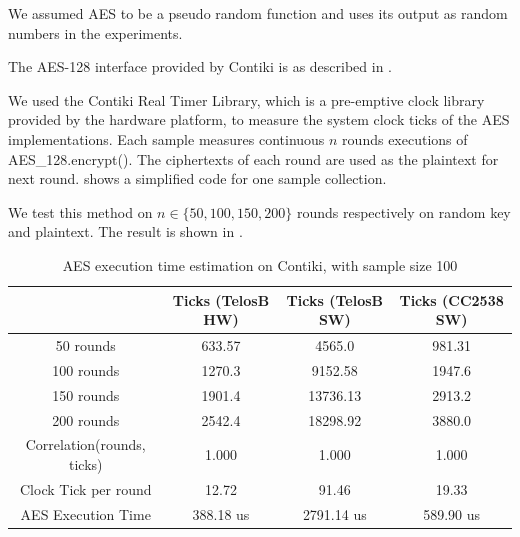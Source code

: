 We assumed AES to be a pseudo random function and uses its output as random numbers in the experiments.

The AES-128 interface provided by Contiki is as described in .

 

We used the Contiki Real Timer Library\cite{RTimer}, which is a pre-emptive clock library provided by the hardware platform, to measure the system clock ticks of the AES implementations. Each sample measures continuous $n$ rounds executions of AES\_128.encrypt(). The ciphertexts of each round are used as the plaintext for next round.
 shows a simplified code for one sample collection.

 

We test this method on  $n \in \{ 50, 100, 150, 200\}$ rounds respectively on random key and plaintext. The result is shown in .

\begin{table}[ht!]
	\center
	\begin{tabular}{|c|c|c|c|}
	\hline
	                               & Ticks (TelosB HW) & Ticks (TelosB SW) & Ticks (CC2538 SW) \\ \hline
	50 rounds                      & 633.57                  & 4565.0                  & 981.31                  \\ \hline
	100 rounds                     & 1270.3                  & 9152.58                 & 1947.6                  \\ \hline
	150 rounds                     & 1901.4                  & 13736.13                & 2913.2                  \\ \hline
	200 rounds                     & 2542.4                  & 18298.92                & 3880.0                  \\ \hline
	Correlation(rounds, ticks)     & 1.000                   & 1.000                   & 1.000                   \\ \hline
        Clock Tick per round & 12.72                   & 91.46                   & 19.33                   \\ \hline
	AES Execution Time   & 388.18 us               & 2791.14 us              & 589.90 us               \\ \hline
	\end{tabular}
	\caption{AES execution time estimation on Contiki, with sample size 100}
	\label{Tbl: AES execution time estimation of Contiki}
\end{table}

